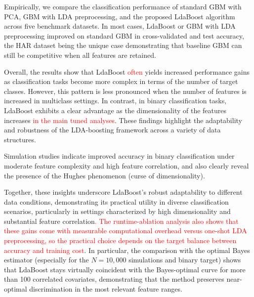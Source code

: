 \documentclass[11pt,a4paper]{article}
\providecommand{\DIFaddtex}[1]{\textcolor{red}{#1}} %
\providecommand{\DIFaddbegin}{} %
\providecommand{\DIFaddend}{} %
\providecommand{\DIFadd}[1]{\texorpdfstring{\DIFaddtex{#1}}{#1}} %
\begin{document}
Empirically, we compare the classification performance of standard GBM with PCA, GBM with LDA preprocessing, and the proposed LdaBoost algorithm across five benchmark datasets. In most cases, LdaBoost or GBM with LDA preprocessing improved on standard GBM in cross-validated and test accuracy, the HAR dataset being the unique case demonstrating that baseline GBM can still be competitive when all features are retained.

Overall, the results show that LdaBoost \DIFaddbegin \DIFadd{often }\DIFaddend yields increased performance gains as classification tasks become more complex in terms of the number of target classes. However, this pattern is less pronounced when the number of features is increased in multiclass settings. In contrast, in binary classification tasks, LdaBoost exhibits a clear advantage as the dimensionality of the features increases \DIFaddbegin \DIFadd{in the main tuned analyses}\DIFaddend . These findings highlight the adaptability and robustness of the LDA-boosting framework across a variety of data structures.

Simulation studies indicate improved accuracy in binary classification under moderate feature complexity and high feature correlation, and also clearly reveal the presence of the Hughes phenomenon (curse of dimensionality).

Together, these insights underscore LdaBoost’s robust adaptability to different data conditions, demonstrating its practical utility in diverse classification scenarios, particularly in settings characterized by high dimensionality and substantial feature correlation\DIFaddbegin \DIFadd{. The runtime-ablation analysis also shows that these gains come with measurable computational overhead versus one-shot LDA preprocessing, so the practical choice depends on the target balance between accuracy and training cost}\DIFaddend . In particular, the comparison with the optimal Bayes estimator (especially for the $N=10{,}000$ simulations and binary target) shows that LdaBoost stays virtually coincident with the Bayes-optimal curve for more than 100 correlated covariates, demonstrating that the method preserves near-optimal discrimination in the most relevant feature ranges.

\newpage
\end{document}

